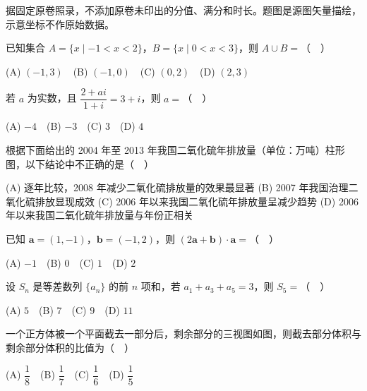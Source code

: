 

\begin{gktip}
据固定原卷照录，不添加原卷未印出的分值、满分和时长。题图是源图矢量描绘，示意坐标不作原始数据。
\end{gktip}


\begin{question}
已知集合 $A=\{x\mid -1<x<2\}$，$B=\{x\mid 0<x<3\}$，则 $A\cup B=$（　）

(A) $(-1,3)$　(B) $(-1,0)$　(C) $(0,2)$　(D) $(2,3)$

\end{question}
\begin{question}
若 $a$ 为实数，且 $\dfrac{2+ai}{1+i}=3+i$，则 $a=$（　）

(A) $-4$　(B) $-3$　(C) $3$　(D) $4$

\Needspace{0.4\textheight}
\end{question}
\begin{question}
根据下面给出的 2004 年至 2013 年我国二氧化硫年排放量（单位：万吨）柱形图，以下结论中不正确的是（　）
\nopagebreak[4]
\begin{center}\end{center}
\nopagebreak[4]
(A) 逐年比较，2008 年减少二氧化硫排放量的效果最显著  
(B) 2007 年我国治理二氧化硫排放显现成效  
(C) 2006 年以来我国二氧化硫年排放量呈减少趋势  
(D) 2006 年以来我国二氧化硫年排放量与年份正相关

\end{question}
\begin{question}
已知 $\boldsymbol a=(1,-1)$，$\boldsymbol b=(-1,2)$，则 $(2\boldsymbol a+\boldsymbol b)\cdot\boldsymbol a=$（　）

(A) $-1$　(B) $0$　(C) $1$　(D) $2$

\end{question}
\begin{question}
设 $S_n$ 是等差数列 $\{a_n\}$ 的前 $n$ 项和，若 $a_1+a_3+a_5=3$，则 $S_5=$（　）

(A) $5$　(B) $7$　(C) $9$　(D) $11$

\Needspace{0.4\textheight}
\end{question}
\begin{question}
一个正方体被一个平面截去一部分后，剩余部分的三视图如图，则截去部分体积与剩余部分体积的比值为（　）
\nopagebreak[4]
\begin{center}\end{center}
\nopagebreak[4]
(A) $\dfrac18$　(B) $\dfrac17$　(C) $\dfrac16$　(D) $\dfrac15$

\end{question}
